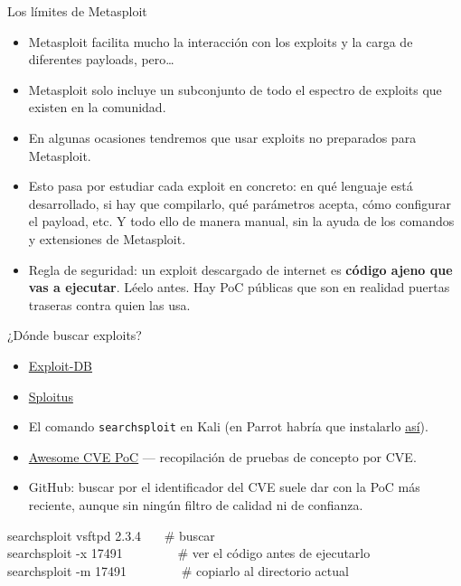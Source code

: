 \documentclass[aspectratio=169,11pt]{beamer}
\newcommand{\cmd}[1]{\texttt{\color{uznavy}#1}}
\newcommand{\cmdbox}[1]{%
  \begin{center}%
  {\setlength{\fboxsep}{6pt}\colorbox{uzlav!40}{\parbox{0.92\linewidth}{\ttfamily\footnotesize #1}}}%
  \end{center}}
\begin{document}
\begin{frame}{Los límites de Metasploit}
\small
  \begin{itemize}
  \item Metasploit facilita mucho la interacción con los exploits y la carga de diferentes payloads, pero\dots
  \item Metasploit solo incluye un subconjunto de todo el espectro de exploits que existen en la comunidad.
  \item En algunas ocasiones tendremos que usar exploits no preparados para Metasploit.
  \item Esto pasa por estudiar cada exploit en concreto: en qué lenguaje está desarrollado, si hay que compilarlo, qué parámetros acepta, cómo configurar el payload, etc. Y todo ello de manera manual, sin la ayuda de los comandos y extensiones de Metasploit.
  \item Regla de seguridad: un exploit descargado de internet es \textbf{código ajeno que vas a ejecutar}. Léelo antes. Hay PoC públicas que son en realidad puertas traseras contra quien las usa.
  \end{itemize}
\end{frame}

\begin{frame}{¿Dónde buscar exploits?}
\small
  \begin{itemize}
  \item \href{https://www.exploit-db.com/}{Exploit-DB}
  \item \href{https://sploitus.com/}{Sploitus}
  \item El comando \cmd{searchsploit} en Kali (en Parrot habría que instalarlo \href{https://www.puckiestyle.nl/install-searchsploit-on-parrot/}{así}).
  \item \href{https://github.com/qazbnm456/awesome-cve-poc}{Awesome CVE PoC} --- recopilación de pruebas de concepto por CVE.
  \item GitHub: buscar por el identificador del CVE suele dar con la PoC más reciente, aunque sin ningún filtro de calidad ni de confianza.
  \end{itemize}
\cmdbox{searchsploit vsftpd 2.3.4 \ \ \ \# buscar\\
searchsploit -x 17491 \ \ \ \ \ \ \ \ \# ver el código antes de ejecutarlo\\
searchsploit -m 17491 \ \ \ \ \ \ \ \ \# copiarlo al directorio actual}
\end{frame}
\end{document}

